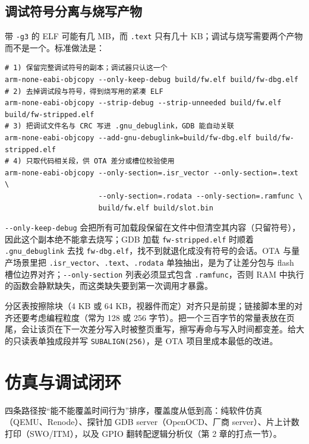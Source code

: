 \documentclass[12pt,a4paper,fontset=fandol]{ctexbook}
\newcommand{\Tp}[1]{\texttt{#1}}
\newcommand{\Opt}[1]{\texttt{-\/-#1}}
\begin{document}
\subsection{调试符号分离与烧写产物}

带 \Tp{-g3} 的 ELF 可能有几 MB，而 \Tp{.text} 只有几十 KB；调试与烧写需要两个产物而不是一个。标准做法是：

\begin{lstlisting}[style=shellstyle,caption={符号分离：调试 ELF 与烧写镜像各留一份},label={lst:ch01-strip}]
# 1) 保留完整调试符号的副本；调试器只认这一个
arm-none-eabi-objcopy --only-keep-debug build/fw.elf build/fw-dbg.elf
# 2) 去掉调试段与符号，得到烧写用的紧凑 ELF
arm-none-eabi-objcopy --strip-debug --strip-unneeded build/fw.elf build/fw-stripped.elf
# 3) 把调试文件名与 CRC 写进 .gnu_debuglink，GDB 能自动关联
arm-none-eabi-objcopy --add-gnu-debuglink=build/fw-dbg.elf build/fw-stripped.elf
# 4) 只取代码相关段，供 OTA 差分或槽位校验使用
arm-none-eabi-objcopy --only-section=.isr_vector --only-section=.text \
                      --only-section=.rodata --only-section=.ramfunc \
                      build/fw.elf build/slot.bin
\end{lstlisting}

\Opt{only-keep-debug} 会把所有可加载段保留在文件中但清空其内容（只留符号），因此这个副本绝不能拿去烧写；GDB 加载 \Tp{fw-stripped.elf} 时顺着 \Tp{.gnu\_debuglink} 去找 \Tp{fw-dbg.elf}，找不到就退化成没有符号的会话。OTA 与量产场景里把 \Tp{.isr\_vector}、\Tp{.text}、\Tp{.rodata} 单独抽出，是为了让差分包与 flash 槽位边界对齐；\Opt{only-section} 列表必须显式包含 \Tp{.ramfunc}，否则 RAM 中执行的函数会静默缺失，而这类缺失要到第一次调用才暴露。

\begin{note}[title={flash 页与对齐对 OTA 分区的影响}]
分区表按擦除块（4 KB 或 64 KB，视器件而定）对齐只是前提；链接脚本里的对齐还要考虑编程粒度（常为 128 或 256 字节）。把一个三百字节的常量表放在页尾，会让该页在下一次差分写入时被整页重写，擦写寿命与写入时间都变差。给大的只读表单独成段并写 \Tp{SUBALIGN(256)}，是 OTA 项目里成本最低的改进。
\end{note}

\section{仿真与调试闭环}

\label{sec:ch01-debug}

四条路径按``能不能覆盖时间行为''排序，覆盖度从低到高：纯软件仿真（QEMU、Renode）、探针加 GDB server（OpenOCD、厂商 server）、片上计数打印（SWO/ITM），以及 GPIO 翻转配逻辑分析仪（第 2 章的打点一节）。
\end{document}
